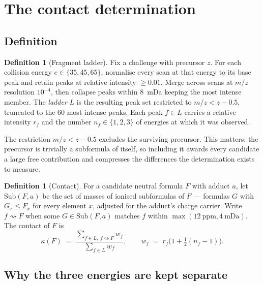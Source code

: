 \documentclass[11pt,twocolumn,a4paper]{article}
\theoremstyle{definition}
\newtheorem{definition}[theorem]{Definition}
\theoremstyle{remark}
\newcommand{\con}{\kappa}
\newcommand{\ppm}{\mathrm{ppm}}
\begin{document}
\section{The contact determination}
\label{sec:contact}

\subsection{Definition}

\begin{definition}[Fragment ladder]
\label{def:ladder}
Fix a challenge with precursor $z$. For each collision energy $e \in \{35, 45,
65\}$, normalise every scan at that energy to its base peak and retain peaks at
relative intensity $\ge 0.01$. Merge across scans at $m/z$ resolution $10^{-4}$,
then collapse peaks within 8~mDa keeping the most intense member. The
\emph{ladder} $L$ is the resulting peak set restricted to $m/z < z - 0.5$,
truncated to the 60 most intense peaks. Each peak $f \in L$ carries a relative
intensity $r_f$ and the number $n_f \in \{1,2,3\}$ of energies at which it was
observed.
\end{definition}

The restriction $m/z < z - 0.5$ excludes the surviving precursor. This matters:
the precursor is trivially a subformula of itself, so including it awards every
candidate a large free contribution and compresses the differences the
determination exists to measure.

\begin{definition}[Contact]
\label{def:contact}
For a candidate neutral formula $F$ with adduct $a$, let $\mathrm{Sub}(F,a)$ be the
set of masses of ionised subformulas of $F$ --- formulas $G$ with $G_x \le F_x$
for every element $x$, adjusted for the adduct's charge carrier. Write $f
\rightsquigarrow F$ when some $G \in \mathrm{Sub}(F,a)$ matches $f$ within
$\max(12~\ppm, 4~\mathrm{mDa})$. The contact of $F$ is
\begin{equation}
\con(F) \;=\;
\frac{\displaystyle\sum_{f \in L,\; f \rightsquigarrow F} w_f}
     {\displaystyle\sum_{f \in L} w_f},
\qquad
w_f \;=\; r_f\bigl(1 + \tfrac{1}{2}(n_f - 1)\bigr).
\label{eq:contact}
\end{equation}
\end{definition}

\subsection{Why the three energies are kept separate}
\end{document}

